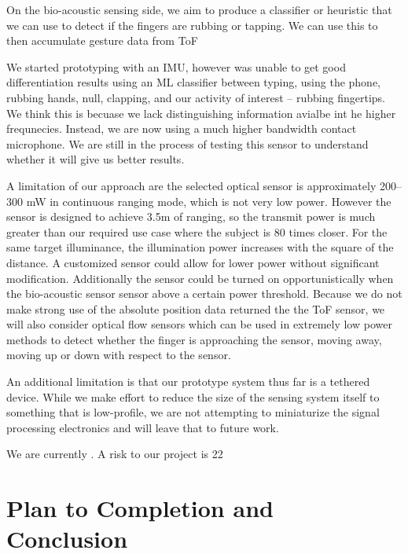 \documentclass [11pt, proquest] {uwthesis}[2020/02/24]
\begin{document}
On the bio-acoustic sensing side, we aim to produce a classifier or heuristic that we can use to detect if the fingers are rubbing or tapping. We can use this to then accumulate gesture data from ToF 

We started prototyping with an IMU, however was unable to get good differentiation results using an ML classifier between typing, using the phone, rubbing hands, null, clapping, and our activity of interest -- rubbing fingertips. We think this is becuase we lack distinguishing information avialbe int he higher frequnecies. Instead, we are now using a much higher bandwidth contact microphone. We are still in the process of testing this sensor to understand whether it will give us better results.

A limitation of our approach are the selected optical sensor is approximately 200--300 mW in continuous ranging mode, which is not very low power. However the sensor is designed to achieve  3.5m of ranging, so the transmit power is much greater than our required use case where the subject is 80 times closer. For the same target illuminance, the illumination power increases with the square of the distance. A customized sensor could allow for lower power without significant modification. Additionally the sensor could be turned on opportunistically when the bio-acoustic sensor sensor above a certain power threshold. Because we do not make strong use of the absolute position data returned the the ToF sensor, we will also consider optical flow sensors which can be used in extremely low power methods to detect whether the finger is approaching the sensor, moving away, moving up or down with respect to the sensor.

An additional limitation is that our prototype system thus far is a tethered  device. While we make effort to reduce the size of the sensing system itself to something that is low-profile, we are not attempting to miniaturize the signal processing electronics and will leave that to future work. 

We are currently . A risk to our project is 22








\chapter{Plan to Completion and Conclusion}
\end{document}
